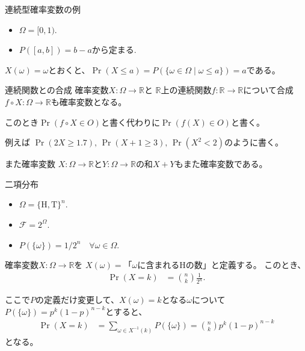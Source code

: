 \documentclass[lualatex,handout]{beamer}
\theoremstyle{definition}
\begin{document}
\begin{frame}{連続型確率変数の例}
\begin{example}
\begin{itemize}
\item $\Omega = [0,1)$.
\item $P([a, b])=b-a$から定まる.
\end{itemize}
$X(\omega) = \omega$とおくと、$\Pr(X\le a) = P(\{\omega\in\Omega\mid\omega\le a\}) = a$である。
\end{example}
\end{frame}

\begin{frame}{連続関数との合成}
確率変数$X\colon\Omega\to\mathbb{R}$と
$\mathbb{R}$上の連続関数$f\colon\mathbb{R}\to\mathbb{R}$について合成 $f\circ X\colon\Omega\to\mathbb{R}$も確率変数となる。

\vspace{1em}
このとき$\Pr(f\circ X \in O)$と書く代わりに$\Pr(f(X)\in O)$と書く。

\vspace{1em}
例えば $\Pr(2X \ge 1.7),\,\Pr(X+1\ge 3),\, \Pr(X^2 < 2)$のように書く。

\vspace{2em}
また確率変数 $X\colon \Omega\to \mathbb{R}$と$Y\colon \Omega\to \mathbb{R}$の和$X+Y$もまた確率変数である。

\end{frame}

\begin{frame}{二項分布}
\begin{itemize}
\item $\Omega = \{\mathrm{H},\mathrm{T}\}^n$.
\item $\mathcal{F} = 2^\Omega$.
\item $P(\{\omega\})=1/2^n\quad\forall \omega\in\Omega$.
\end{itemize}

\vspace{1em}
確率変数$X\colon\Omega\to\mathbb{R}$を
$X(\omega)=\text{「$\omega$に含まれる$\mathrm{H}$の数」}$と定義する。
このとき、
\begin{align*}
\Pr(X = k) &= \binom{n}{k} \frac1{2^n}.
\end{align*}

\vspace{1em}
ここで$P$の定義だけ変更して、$X(\omega)=k$となる$\omega$について$P(\{\omega\})=p^k(1-p)^{n-k}$とすると、
\begin{align*}
\Pr(X = k) &= \sum_{\omega\in X^{-1}(k)} P(\{\omega\}) =\binom{n}{k} p^k(1-p)^{n-k}
\end{align*}
となる。
\end{frame}
\end{document}
